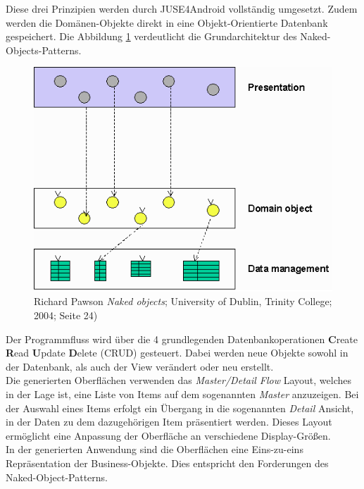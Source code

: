 \documentclass[a4paper,twoside]{article}
\begin{document}
Diese drei Prinzipien werden durch JUSE4Android vollständig umgesetzt. Zudem werden die Domänen-Objekte direkt in eine Objekt-Orientierte Datenbank gespeichert. Die Abbildung \ref{fig:Grafik3} verdeutlicht die Grundarchitektur des Naked-Objects-Patterns.\\
\begin{figure}[!h]
	\centering
	\includegraphics[scale=.5]{pics/NakedObjectPattern.png}
	\caption[Naked-Object-Pattern Architektur nach Richard Pawson, University of Dublin, Trinity College]{ Richard Pawson  \emph{\glqq Naked objects\grqq{}}; University of Dublin, Trinity College; 2004; Seite 24)}
	\label{fig:Grafik3}
\end{figure}

Der Programmfluss wird über die 4 grundlegenden Datenbankoperationen \textbf{C}reate \textbf{R}ead \textbf{U}pdate \textbf{D}elete (CRUD) gesteuert. Dabei werden neue Objekte sowohl in der Datenbank, als auch der View verändert oder neu erstellt.\\ 
Die generierten Oberflächen verwenden das \textit{Master/Detail Flow} Layout, welches in der Lage ist, eine Liste von Items auf dem sogenannten \textit{Master} anzuzeigen. Bei der Auswahl eines Items erfolgt ein Übergang in die sogenannten \textit{Detail} Ansicht, in der Daten zu dem dazugehörigen Item präsentiert werden. Dieses Layout ermöglicht eine Anpassung der Oberfläche an verschiedene  Display-Größen.\\
In der generierten Anwendung sind die Oberflächen eine Eins-zu-eins Repräsentation der Business-Objekte. Dies entspricht den Forderungen des Naked-Object-Patterns.
\end{document}
